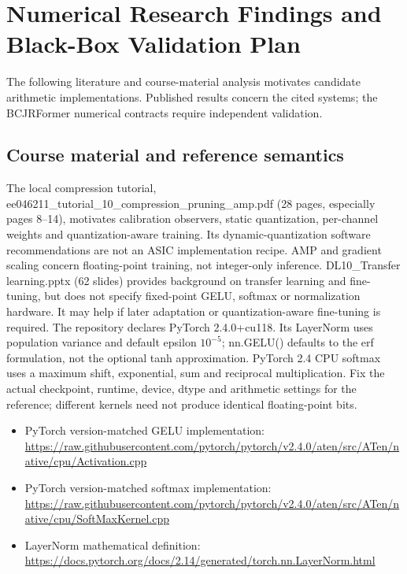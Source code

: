 \documentclass[11pt,a4paper]{article}
\begin{document}
\section{Numerical Research Findings and Black-Box Validation Plan}
The following literature and course-material analysis motivates candidate arithmetic implementations. Published results concern the cited systems; the BCJRFormer numerical contracts require independent validation.

\subsection{Course material and reference semantics}
The local compression tutorial, ee046211\_tutorial\_10\_compression\_pruning\_amp.pdf (28 pages, especially pages 8--14), motivates calibration observers, static quantization, per-channel weights and quantization-aware training. Its dynamic-quantization software recommendations are not an ASIC implementation recipe. AMP and gradient scaling concern floating-point training, not integer-only inference.
DL10\_Transfer learning.pptx (62 slides) provides background on transfer learning and fine-tuning, but does not specify fixed-point GELU, softmax or normalization hardware. It may help if later adaptation or quantization-aware fine-tuning is required.
The repository declares PyTorch 2.4.0+cu118. Its LayerNorm uses population variance and default epsilon $10^{-5}$; nn.GELU() defaults to the erf formulation, not the optional tanh approximation. PyTorch 2.4 CPU softmax uses a maximum shift, exponential, sum and reciprocal multiplication. Fix the actual checkpoint, runtime, device, dtype and arithmetic settings for the reference; different kernels need not produce identical floating-point bits.
\begin{itemize}
\item PyTorch version-matched GELU implementation: \url{https://raw.githubusercontent.com/pytorch/pytorch/v2.4.0/aten/src/ATen/native/cpu/Activation.cpp}
\item PyTorch version-matched softmax implementation: \url{https://raw.githubusercontent.com/pytorch/pytorch/v2.4.0/aten/src/ATen/native/cpu/SoftMaxKernel.cpp}
\item LayerNorm mathematical definition: \url{https://docs.pytorch.org/docs/2.14/generated/torch.nn.LayerNorm.html}
\end{itemize}
\end{document}
